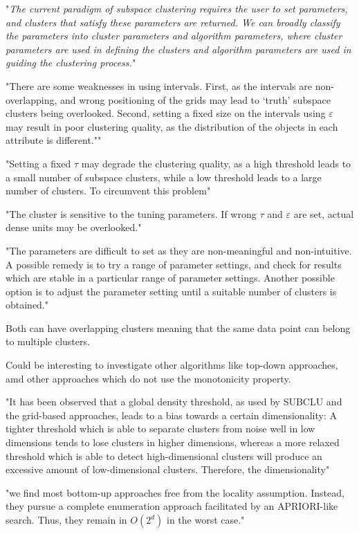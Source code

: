 "\textit{The current paradigm of subspace clustering requires the user to set parameters, and clusters that satisfy these parameters are returned. We can broadly classify the parameters into cluster parameters and algorithm parameters, where cluster parameters are used in defining the clusters and algorithm parameters are used in guiding the clustering process.}" \cite[p.~342]{sim-2012}

"There are some weaknesses in using intervals. First, as the intervals are non-overlapping, and wrong positioning of the grids may lead to ‘truth’ subspace clusters being overlooked. Second, setting a fixed size on the intervals using $\varepsilon$ may result in poor clustering quality, as the distribution of the objects in each attribute is different."" \cite[p.~351]{sim-2012}

"Setting a fixed $\tau$ may degrade the clustering quality, as a high threshold leads to a small number of subspace clusters, while a low threshold leads to a large number of clusters. To circumvent this problem" \cite[p.~352]{sim-2012}

"The cluster is sensitive to the tuning parameters. If wrong $\tau$ and $\varepsilon$ are set, actual dense units may be overlooked." \cite[p.~352]{sim-2012}

"The parameters are difficult to set as they are non-meaningful and non-intuitive. A possible remedy is to try a range of parameter settings, and check for results which are stable in a particular range of parameter settings. Another possible option is to adjust the parameter setting until a suitable number of clusters is obtained." \cite[p.~352]{sim-2012}


Both can have overlapping clusters meaning that the same data point can belong to multiple clusters.

Could be interesting to investigate other algorithms like top-down approaches, amd other approaches which do not use the monotonicity property.


"It has been observed that a global density threshold, as used by SUBCLU and the grid-based approaches, leads to a bias towards a certain dimensionality: A tighter threshold which is able to separate clusters from noise well in low dimensions tends to lose clusters in higher dimensions, whereas a more relaxed threshold which is able to detect high-dimensional clusters will produce an
excessive amount of low-dimensional clusters. Therefore, the dimensionality" \cite[p.1:16]{kriegel-2009}

"we find most bottom-up approaches free from the locality assumption. Instead, they pursue a complete enumeration approach facilitated by an APRIORI-like search. Thus, they remain in $O(2^d)$ in the worst case." \cite[p.1:41]{kriegel-2009}


